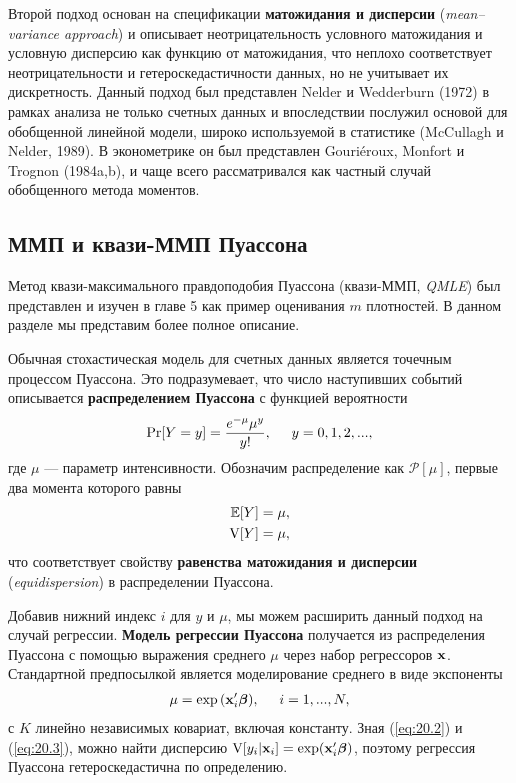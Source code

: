 Второй подход основан на спецификации \textbf{матожидания и дисперсии} (\textit{mean--variance approach}) и описывает неотрицательность условного матожидания и условную дисперсию как функцию от матожидания, что неплохо соответствует неотрицательности и гетероскедастичности данных, но не учитывает их дискретность. Данный подход был представлен Nelder и Wedderburn (1972) в рамках анализа не только счетных данных и впоследствии послужил основой для обобщенной линейной модели, широко используемой в статистике (McCullagh и Nelder, 1989). В эконометрике он был представлен Gouri\'eroux, Monfort и Trognon (1984a,b), и чаще всего рассматривался как частный случай обобщенного метода моментов.


\subsection{ММП и квази-ММП Пуассона}\label{sec:20.2.2}

\noindent
Метод квази-максимального правдоподобия Пуассона (квази-ММП, \textit{QMLE}) был представлен и изучен в главе 5 %
как пример оценивания $m$ плотностей. В данном разделе мы представим более полное описание.

Обычная стохастическая модель для счетных данных является точечным процессом Пуассона. Это подразумевает, что число наступивших событий описывается \textbf{распределением Пуассона} с функцией вероятности
    \begin{align}\label{eq:20.1}
    \Pr [Y=y]=\frac{e^{-\mu}\mu^y}{y!}, \hspace{0.5cm} y=0,1,2,...,
    \end{align}
где $\mu$ --- параметр интенсивности. Обозначим распределение как $\mathcal{P}[\mu]$, первые два момента которого равны
    \begin{align}\label{eq:20.2}
    \E[Y] = \mu, \\
    \V[Y] = \mu, \notag
    \end{align}
что соответствует свойству \textbf{равенства матожидания и дисперсии} (\textit{equidispersion}) в распределении Пуассона.

Добавив нижний индекс $i$ для $y$ и $\mu$, мы можем расширить данный подход на случай регрессии. \textbf{Модель регрессии Пуассона} получается из распределения Пуассона с помощью выражения среднего $\mu$ через набор регрессоров $\x$. Стандартной предпосылкой является моделирование среднего в виде экспоненты
    \begin{align}\label{eq:20.3}
    \mu = \exp{(\xib)}, \hspace{0.5cm} i=1,...,N,
    \end{align}
с $K$ линейно независимых ковариат, включая константу. Зная (\ref{eq:20.2}) и (\ref{eq:20.3}), можно найти дисперсию $\V[y_i|\x_i] = \exp(\xib)$, поэтому регрессия Пуассона гетероскедастична по определению.

